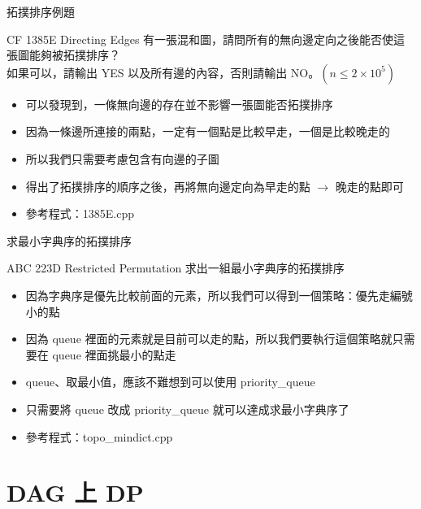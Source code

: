\documentclass[aspectratio=169]{beamer}
\begin{document}
    \begin{frame}{拓撲排序例題}
        \begin{block}{CF 1385E Directing Edges}
            有一張混和圖，請問所有的無向邊定向之後能否使這張圖能夠被拓撲排序？\\
            如果可以，請輸出 YES 以及所有邊的內容，否則請輸出 NO。$(n \le 2 \times 10^5)$
        \end{block}

        \begin{itemize}
            \item<2-> 可以發現到，一條無向邊的存在並不影響一張圖能否拓撲排序
            \item<3-> 因為一條邊所連接的兩點，一定有一個點是比較早走，一個是比較晚走的
            \item<4-> 所以我們只需要考慮包含有向邊的子圖
            \item<5-> 得出了拓撲排序的順序之後，再將無向邊定向為早走的點 $\rightarrow$ 晚走的點即可
            \item<5-> 參考程式：1385E.cpp
        \end{itemize}
    \end{frame}

    \begin{frame}{求最小字典序的拓撲排序}
        \begin{block}{ABC 223D Restricted Permutation}
            求出一組最小字典序的拓撲排序
        \end{block}

        \begin{itemize}
            \item<1-> 因為字典序是優先比較前面的元素，所以我們可以得到一個策略：優先走編號小的點
            \item<2-> 因為 queue 裡面的元素就是目前可以走的點，所以我們要執行這個策略就只需要在 queue 裡面挑最小的點走
            \item<3-> queue、取最小值，應該不難想到可以使用 priority\_queue
            \item<3-> 只需要將 queue 改成 priority\_queue 就可以達成求最小字典序了
            \item<3-> 參考程式：topo\_mindict.cpp
        \end{itemize}
    \end{frame}

    \section{DAG 上 DP}
\end{document}

